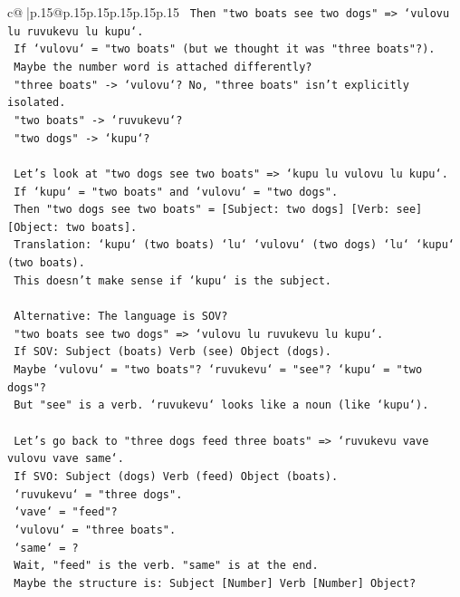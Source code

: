 \documentclass{article}
\begin{document}
{\begin{supertabular}{c@{$\;$}|p{.15\linewidth}@{}p{.15\linewidth}p{.15\linewidth}p{.15\linewidth}p{.15\linewidth}p{.15\linewidth}}
{{{\texttt{   Then "two boats see two dogs" => `vulovu lu ruvukevu lu kupu`.} \\
\texttt{   If `vulovu` = "two boats" (but we thought it was "three boats"?).} \\
\texttt{   Maybe the number word is attached differently?} \\
\texttt{   "three boats" {-}> `vulovu`? No, "three boats" isn't explicitly isolated.} \\
\texttt{   "two boats" {-}> `ruvukevu`?} \\
\texttt{   "two dogs" {-}> `kupu`?} \\
\\ 
\texttt{   Let's look at "two dogs see two boats" => `kupu lu vulovu lu kupu`.} \\
\texttt{   If `kupu` = "two boats" and `vulovu` = "two dogs".} \\
\texttt{   Then "two dogs see two boats" = {[}Subject: two dogs{]} {[}Verb: see{]} {[}Object: two boats{]}.} \\
\texttt{   Translation: `kupu` (two boats) `lu` `vulovu` (two dogs) `lu` `kupu` (two boats).} \\
\texttt{   This doesn't make sense if `kupu` is the subject.} \\
\\ 
\texttt{   Alternative: The language is SOV?} \\
\texttt{   "two boats see two dogs" => `vulovu lu ruvukevu lu kupu`.} \\
\texttt{   If SOV: Subject (boats) Verb (see) Object (dogs).} \\
\texttt{   Maybe `vulovu` = "two boats"? `ruvukevu` = "see"? `kupu` = "two dogs"?} \\
\texttt{   But "see" is a verb. `ruvukevu` looks like a noun (like `kupu`).} \\
\\ 
\texttt{   Let's go back to "three dogs feed three boats" => `ruvukevu vave vulovu vave same`.} \\
\texttt{   If SVO: Subject (dogs) Verb (feed) Object (boats).} \\
\texttt{   `ruvukevu` = "three dogs".} \\
\texttt{   `vave` = "feed"?} \\
\texttt{   `vulovu` = "three boats".} \\
\texttt{   `same` = ?} \\
\texttt{   Wait, "feed" is the verb. "same" is at the end.} \\
\texttt{   Maybe the structure is: Subject {[}Number{]} Verb {[}Number{]} Object?} \\
}}}
\end{supertabular}}
\end{document}
